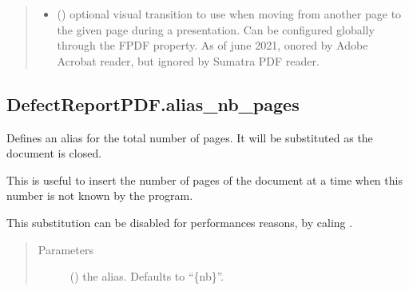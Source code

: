 \documentclass[letterpaper,10pt,english]{sphinxmanual}
\begin{document}
\begin{fulllineitems}
\begin{fulllineitems}
\begin{quote}
\begin{description}
\begin{itemize}
\item {} 
\sphinxAtStartPar
{} () \textendash{} optional visual transition to use when moving
from another page to the given page during a presentation.
Can be configured globally through the  FPDF property.
As of june 2021, onored by Adobe Acrobat reader, but ignored by Sumatra PDF reader.

\end{itemize}

\end{description}\end{quote}

\end{fulllineitems}



\subsection{DefectReportPDF.alias\_nb\_pages}
\label{\detokenize{generated/quality_assessment.quality_pdf_report.DefectReportPDF.alias_nb_pages:defectreportpdf-alias-nb-pages}}\label{\detokenize{generated/quality_assessment.quality_pdf_report.DefectReportPDF.alias_nb_pages::doc}}

\begin{fulllineitems}
\label{\detokenize{generated/quality_assessment.quality_pdf_report.DefectReportPDF.alias_nb_pages:quality_assessment.quality_pdf_report.DefectReportPDF.alias_nb_pages}}
\sphinxAtStartPar
Defines an alias for the total number of pages.
It will be substituted as the document is closed.

\sphinxAtStartPar
This is useful to insert the number of pages of the document
at a time when this number is not known by the program.

\sphinxAtStartPar
This substitution can be disabled for performances reasons, by caling .
\begin{quote}\begin{description}
\item[{Parameters}] \leavevmode
\sphinxAtStartPar
{} () \textendash{} the alias. Defaults to “\{nb\}”.


\end{description}
\end{quote}
\end{fulllineitems}
\end{fulllineitems}
\end{document}
